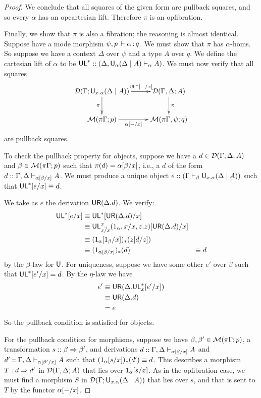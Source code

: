 \begin{proof}
We conclude that all squares of the given form are pullback squares, and so every $\alpha$ has an opcartesian lift. Therefore $\pi$ is an opfibration.

Finally, we show that $\pi$ is also a fibration; the reasoning is almost identical. Suppose have a mode morphism $\psi, p \, \vdash \alpha \, \mathit{:} \, q$. We must show that $\pi$ has $\alpha$-homs. So suppose we have a context $\Delta$ over $\psi$ and a type $A$ over $q$. We define the cartesian lift of $\alpha$ to be $\mathsf{UL}^* :: (\Delta, \mathsf{U}_{\alpha}(\Delta \mid A) \vdash_{\alpha} A)$. We must now verify that all squares
\[ \xymatrix{
    \cD(\Gamma;\U{x.\alpha}{\Delta}{A}) \ar[r]^-{\Cut{\UL^*}{-}{x}} \ar[d]_\pi &
    \cD(\Gamma,\Delta;A) \ar[d]^\pi \\
    \M(\pi\Gamma;p) \ar[r]_-{\Cut{\alpha}{-}{x}} &
    \M(\pi\Gamma, \psi; q)
  }\]
are pullback squares.

To check the pullback property for objects, suppose we have a $d \in \mathcal{D}(\Gamma,\Delta;A)$ and $\beta \in \mathcal{M}(\pi\Gamma;p)$ such that $\pi(d) = \alpha[\beta/x]$, i.e., a $d$ of the form $d :: \Gamma, \Delta \vdash_{\alpha[\beta/x]} A$. We must produce a unique object $e :: (\Gamma \vdash_{\beta} \mathsf{U}_{x.\alpha}(\Delta \mid A))$ such that $\mathsf{UL}^*[e/x] \equiv d$.

We take as $e$ the derivation $\mathsf{UR}(\Delta.d)$. We verify:
\begin{align*}
\mathsf{UL}^*[e/x] 
&\equiv \mathsf{UL}^*[\mathsf{UR}(\Delta.d)/x] \\
&\equiv \mathsf{UL}^{x}_{\vec{x/x}}(1_\alpha,{x}/x,z.z)
[\mathsf{UR}(\Delta.d)/x] \\
&\equiv (1_\alpha[1_\beta/x])_*(z[d/z]) \\
&\equiv (1_{\alpha[\beta/x]})_*(d)
&\equiv d
\end{align*}
by the $\beta$-law for $\mathsf{U}$. For uniqueness, suppose we have some other $e'$ over $\beta$ such that $\mathsf{UL}^*[e'/x] = d$. By the $\eta$-law we have
\begin{align*}
e' 
&\equiv \mathsf{UR}(\Delta.\mathsf{UL}^*_{x}[e'/x])\\
&\equiv \mathsf{UR}(\Delta.d) \\
&= e
\end{align*}
So the pullback condition is satisfied for objects.

For the pullback condition for morphisms, suppose we have $\beta, \beta' \in \mathcal{M}(\pi\Gamma;p)$, a transformation $s :: \beta \Rightarrow \beta'$, and derivations $d :: \Gamma, \Delta \vdash_{\alpha[\beta/x]} A$ and $d' :: \Gamma, \Delta \vdash_{\alpha[\beta'/x]} A$ such that $(1_\alpha[s/x])_*(d') \equiv d$. This describes a morphism $T : d \Rightarrow d'$ in $\mathcal{D}(\Gamma,\Delta;A)$ that lies over $1_\alpha[s/x]$. As in the opfibration case, we must find a morphism $S$ in $\mathcal{D}(\Gamma;\mathsf{U}_{x.\alpha}(\Delta \mid A))$ that lies over $s$, and that is sent to $T$ by the functor $\alpha[-/x]$.


\end{proof}
